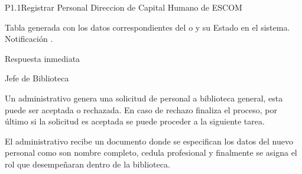 \begin{Proceso}{P1.1}{Registrar Personal}
   { %
    Direccion de Capital Humano de ESCOM
  }

   { %
    \begin{UClist}
    
      \UCli Tabla generada con los datos correspondientes del  o  y su Estado en el sistema.
      \UCli   Notificación .
    \end{UClist}
  }

   { %
  }

   { %
    \begin{UClist}
      \UCli Respuesta inmediata
      
    \end{UClist}
  }
   { %
}


\end{Proceso}

\begin{PDescripcion}

  \Ppaso Jefe de Biblioteca

    \begin{enumerate}

      \Ppaso[\itarea] Un administrativo genera una solicitud de personal a biblioteca general, esta puede ser aceptada o rechazada. En caso de rechazo finaliza el proceso, por último si la solicitud es aceptada se puede proceder a la siguiente tarea. 

\Ppaso[\itarea]  El administrativo recibe un documento donde se especifican los datos del nuevo personal como son nombre completo, cedula profesional y finalmente se asigna el rol que desempeñaran dentro de la biblioteca.

	

    \end{enumerate}
    
    
\end{PDescripcion}


